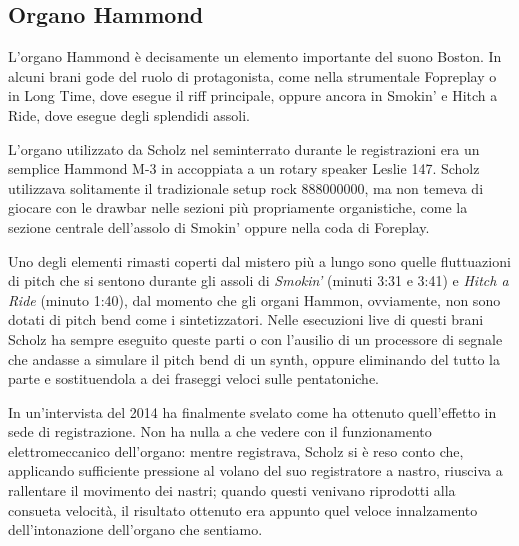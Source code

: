 \documentclass[class=book, crop=false, oneside, 12pt]{standalone}
\begin{document}
\subsection{Organo Hammond}
L'organo Hammond è decisamente un elemento importante del suono Boston. In alcuni brani gode del ruolo di protagonista, come nella strumentale Fopreplay o in Long Time, dove esegue il riff principale, oppure ancora in Smokin' e Hitch a Ride, dove esegue degli splendidi assoli.

L'organo utilizzato da Scholz nel seminterrato durante le registrazioni era un semplice Hammond M-3 in accoppiata a un rotary speaker Leslie 147. Scholz utilizzava solitamente il tradizionale setup rock \(888000000\), ma non temeva di giocare con le drawbar nelle sezioni più propriamente organistiche, come la sezione centrale dell'assolo di Smokin' oppure nella coda di Foreplay.

Uno degli elementi rimasti coperti dal mistero più a lungo sono quelle fluttuazioni di pitch che si sentono durante gli assoli di \emph{Smokin'} (minuti 3:31 e 3:41) e \emph{Hitch a Ride} (minuto 1:40), dal momento che gli organi Hammon, ovviamente, non sono dotati di pitch bend come i sintetizzatori. Nelle esecuzioni live di questi brani Scholz ha sempre eseguito queste parti o con l'ausilio di un processore di segnale che andasse a simulare il pitch bend di un synth\cite{yt:smokin_live_1}, oppure eliminando del tutto la parte e sostituendola a dei fraseggi veloci sulle pentatoniche\cite{yt:smokin_live_2}. 

In un'intervista del 2014 ha finalmente svelato come ha ottenuto quell'effetto in sede di registrazione. Non ha nulla a che vedere con il funzionamento elettromeccanico dell'organo: mentre registrava, Scholz si è reso conto che, applicando sufficiente pressione al volano del suo registratore a nastro, riusciva a rallentare il movimento dei nastri; quando questi venivano riprodotti alla consueta velocità, il risultato ottenuto era appunto quel veloce innalzamento dell'intonazione dell'organo che sentiamo\cite{site:thirdstage_organ}. 
\end{document}
